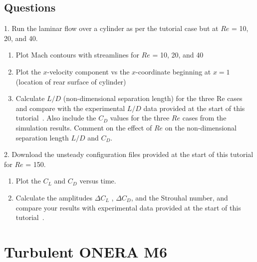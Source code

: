\section{Questions}
1. Run the laminar flow over a cylinder as per the tutorial case but at $Re$ = 10, 20, and 40.
\begin{enumerate}[label=(\alph*)]
    \item Plot Mach contours with streamlines for $Re$ = 10, 20, and 40
    \item Plot the $x$-velocity component vs the $x$-coordinate beginning at $x = 1$ (location of rear surface of cylinder)
    \item Calculate $L/D$ (non-dimensional separation length) for the three Re cases and compare with the experimental $L/D$ data provided at the start of this tutorial~\cite{coutanceau1977experimental}. Also include the $C_D$ values for the three $Re$ cases from the simulation results. Comment on the effect of $Re$ on the non-dimensional separation length $L/D$ and $C_D$.
\end{enumerate}
2. Download the unsteady configuration files provided at the start of this tutorial for $Re$ = 150.
\begin{enumerate}[label=(\alph*)]
    \item Plot the $C_L$ and $C_D$ versus time.
    \item Calculate the amplitudes $\Delta C_L$ , $\Delta C_D$, and the Strouhal number, and compare your results with experimental data provided at the start of this tutorial~\cite{inoue2002sound}.
\end{enumerate}
\chapter{Turbulent ONERA M6}
\label{ch:Turbulent ONERA M6}

